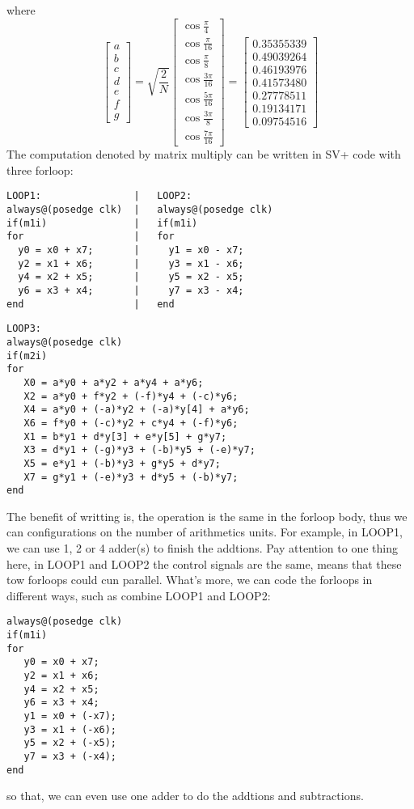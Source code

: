 where \[ \left[ \begin{array}{lllllll}
a \\ b \\ c \\ d \\ e \\ f \\ g
\end{array}
\right]  = \sqrt{\frac{2}{N}} \left[ \begin{array}{lllllll}
\cos\frac{\pi}{4} \\ \cos\frac{\pi}{16} \\ \cos\frac{\pi}{8} \\
\cos\frac{3\pi}{16} \\ \cos\frac{5\pi}{16} \\ \cos\frac{3\pi}{8} \\
\cos\frac{7\pi}{16}
\end{array}
\right] = \left[ \begin{array}{lllllll}
0.35355339 \\ 0.49039264 \\ 0.46193976 \\ 0.41573480 \\
0.27778511 \\ 0.19134171 \\ 0.09754516
\end{array}
\right]
\]
The computation denoted by matrix multiply can be written in SV+ code with three forloop:
\begin{verbatim}
LOOP1:                |   LOOP2:
always@(posedge clk)  |   always@(posedge clk)
if(m1i)               |   if(m1i)
for                   |   for
  y0 = x0 + x7;       |     y1 = x0 - x7;
  y2 = x1 + x6;       |     y3 = x1 - x6;
  y4 = x2 + x5;       |     y5 = x2 - x5;
  y6 = x3 + x4;       |     y7 = x3 - x4;
end                   |   end
\end{verbatim}
\begin{verbatim}
LOOP3:
always@(posedge clk)
if(m2i)
for
   X0 = a*y0 + a*y2 + a*y4 + a*y6;
   X2 = a*y0 + f*y2 + (-f)*y4 + (-c)*y6;
   X4 = a*y0 + (-a)*y2 + (-a)*y[4] + a*y6;
   X6 = f*y0 + (-c)*y2 + c*y4 + (-f)*y6;
   X1 = b*y1 + d*y[3] + e*y[5] + g*y7;
   X3 = d*y1 + (-g)*y3 + (-b)*y5 + (-e)*y7;
   X5 = e*y1 + (-b)*y3 + g*y5 + d*y7;
   X7 = g*y1 + (-e)*y3 + d*y5 + (-b)*y7;
end
\end{verbatim}
The benefit of writting is, the operation is the same in the forloop body, thus we can configurations on the number of arithmetics units. For example, in LOOP1, we can use 1, 2 or 4 adder(s) to finish the addtions. Pay attention to one thing here, in LOOP1 and LOOP2 the control signals are the same, means that these tow forloops could cun parallel. What's more, we can code the forloops in different ways, such as combine LOOP1 and LOOP2:
\begin{verbatim}
always@(posedge clk)
if(m1i)
for
   y0 = x0 + x7;
   y2 = x1 + x6;
   y4 = x2 + x5;
   y6 = x3 + x4;
   y1 = x0 + (-x7);
   y3 = x1 + (-x6);
   y5 = x2 + (-x5);
   y7 = x3 + (-x4);
end
\end{verbatim}
so that, we can even use one adder to do the addtions and subtractions.